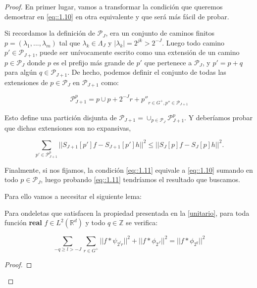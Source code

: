 \begin{proof}

\noindent En primer lugar, vamos a transformar la condición que queremos demostrar en \eqref{eq::1.10} en otra equivalente y que será más fácil de probar.

\medskip

\noindent Si recordamos la definición de $\mathcal{P}_J$, era un conjunto de caminos finitos $p=(\lambda_1,...,\lambda_m)$ tal que $\lambda_k\in\Lambda_J$ y $|\lambda_k|=2^{jk}>2^{-J}$. Luego todo camino $p' \in \mathcal{P}_{J+1}$, puede ser unívocamente escrito como una extensión de un camino $p\in \mathcal{P}_J$ donde $p$ es el prefijo más grande de $p'$ que pertenece a $\mathcal{P}_J$, y $p'=p+q$ para algún $q\in \mathcal{P}_{J+1}$. De hecho, podemos definir el conjunto de todas las extensiones de $p\in \mathcal{P}_J$ en $\mathcal{P}_{J+1}$ como: 

\begin{equation}
  \mathcal{P}_{J+1}^{p}={p} \cup {p+2^{-J}r+p''}_{r\in G^{+},p''\in \mathcal{P}_{J+1}}
\end{equation}

Esto define una partición disjunta de $\mathcal{P}_{J+1}=\cup_{p \in \mathcal{P}_J} \mathcal{P}_{J+1}^{p}$. Y deberíamos probar que dichas extensiones son no expansivas,

\begin{equation}\label{eq::1.11}
  \sum_{p' \in \mathcal{P}_{J+1}^p} || S_{J+1}[p']f-S_{J+1}[p']h||^2 \leq ||S_{J}[p]f-S_J [p]h||^2.
\end{equation}

\noindent Finalmente, si nos fijamos, la condición \eqref{eq::1.11} equivale a \eqref{eq::1.10} sumando en todo $p\in \mathcal{P}_J$, luego probando \eqref{eq::1.11} tendríamos el resultado que buscamos. 


\medskip


\noindent Para ello vamos a necesitar el siguiente lema:

\begin{lema}
  Para ondeletas que satisfacen la propiedad presentada en la \autoref{unitario}, para toda función \textbf{real} $f\in L^2(\mathbb{R}^d)$ y todo $q \in \mathbb{Z}$ se verifica: 

  $$\sum_{-q\geq l > -J} \sum_{r \in G^+} || f \ast \psi_{2^lr}||^2 + || f \ast \phi_{2^J}||^2 = || f \ast \phi_{2^q} ||^2$$

\end{lema}

\begin{proof}


\end{proof}
\end{proof}
